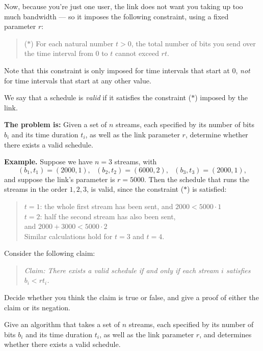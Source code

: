\documentclass[12pt]{article}
\begin{document}
\begin{enumerate}
Now, because you're just one user, the link does not want
you taking up too much bandwidth --- so it imposes the
following constraint, using a fixed parameter $r$:
\begin{quote}
($\ast$) For each natural number $t > 0$, the total number of bits you send
over the time interval from $0$ to $t$ cannot exceed $rt$.
\end{quote}
Note that this constraint is only imposed for time
intervals that start at $0$, {\em not} for time
intervals that start at any other value.

We say that a schedule is {\em valid} if it satisfies
the constraint ($\ast$) imposed by the link.

\bigskip
\bigskip
{\bf The problem is:} Given a set of $n$ streams,
each specified by its number of bits $b_i$
and its time duration $t_i$,
as well as the link parameter $r$,
determine whether there exists a valid schedule.

\bigskip
\bigskip
{\bf Example.}  Suppose we have $n = 3$ streams, with
$$(b_1,t_1) = (2000,1), ~~~ (b_2,t_2) = (6000,2), ~~~ (b_3,t_3)
= (2000,1),$$
and suppose the link's parameter is $r = 5000$.
Then the schedule that runs the streams in the order $1, 2, 3$,
is valid, since the constraint ($\ast$) is satisfied:
\begin{quote}
$t = 1$: the whole first stream has been sent, and $2000 < 5000 \cdot 1$ \\
$t = 2$: half the second stream has also been sent, \\
\hspace*{0.5in} and $2000 + 3000 < 5000 \cdot 2$ \\
Similar calculations hold for $t = 3$ and $t = 4$.
\end{quote}


Consider the following claim:
\begin{quote}
{\em Claim: There exists a valid schedule if and only
if each stream $i$ satisfies $b_i < r t_i$.}
\end{quote}
Decide whether you think the claim is true or false,
and give a proof of either the claim or its negation.

Give an algorithm that takes a set of $n$ streams,
each specified by its number of bits $b_i$
and its time duration $t_i$,
as well as the link parameter $r$,
and determines whether there exists a valid schedule.


\end{enumerate}
\end{document}
